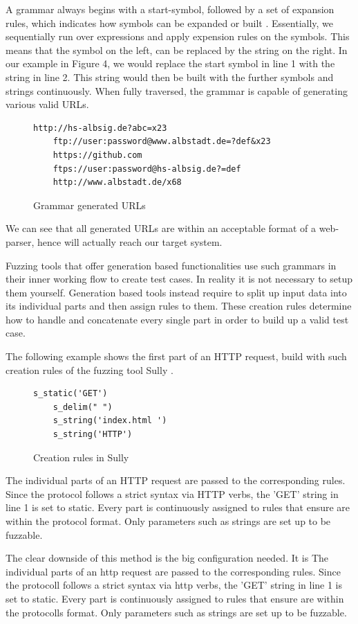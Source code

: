 \documentclass[journal=tosc,final]{iacrtrans}
\begin{document}
A grammar always begins with a start-symbol, followed by a set of expansion rules, which indicates how symbols can be expanded or built \cite{fuzz}. 
Essentially, we sequentially run over expressions and apply expension rules on the symbols. This means that the symbol on the left, can be replaced by the string on the right. In our example in Figure 4, we would replace the start symbol in line 1 with the string in line 2. This string would then be built with the further symbols and strings continuously. When fully traversed, the grammar is capable of generating various valid URLs.
\begin{figure}[h]
 \caption{Grammar generated URLs}
 \begin{lstlisting}[style=code]
	http://hs-albsig.de?abc=x23
	ftp://user:password@www.albstadt.de=?def&x23
	https://github.com
	ftps://user:password@hs-albsig.de?=def
	http://www.albstadt.de/x68
 \end{lstlisting} 
\end{figure}
\newpage
We can see that all generated URLs are within an acceptable format of a web-parser, hence will actually reach our target system.

Fuzzing tools that offer generation based functionalities use such grammars in their inner working flow to create test cases. In reality it is not necessary to setup them yourself. Generation based tools instead require to split up input data into its individual parts and then assign rules to them. These creation rules determine how to handle and concatenate every single part in order to build up a valid test case. 

The following example shows the first part of an HTTP request, build with such creation rules of the fuzzing tool Sully \cite{sully}.
\begin{figure}[h]
 \caption{Creation rules in Sully}
 \begin{lstlisting}[style=code]
	s_static('GET')
	s_delim(" ")
	s_string('index.html ')
	s_string('HTTP')
 \end{lstlisting}
\end{figure}

The individual parts of an HTTP request are passed to the corresponding rules. Since the protocol follows a strict syntax via HTTP verbs, the 'GET' string in line 1 is set to static. Every part is continuously assigned to rules that ensure are within the protocol format. Only parameters such as strings are set up to be fuzzable.
   
The clear downside of this method is the big configuration needed. It is The individual parts of an http request are passed to the corresponding rules. Since the protocoll follows a strict syntax via http verbs, the 'GET' string in line 1 is set to static. Every part is continuously assigned to rules that ensure are within the protocolls format. Only parameters such as strings are set up to be fuzzable.
   
\end{document}
